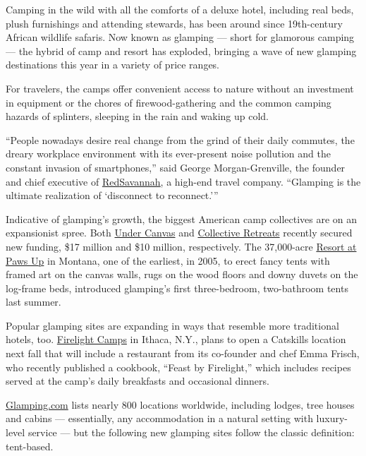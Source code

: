 Camping in the wild with all the comforts of a deluxe hotel, including
real beds, plush furnishings and attending stewards, has been around
since 19th-century African wildlife safaris. Now known as glamping ---
short for glamorous camping --- the hybrid of camp and resort has
exploded, bringing a wave of new glamping destinations this year in a
variety of price ranges.

For travelers, the camps offer convenient access to nature without an
investment in equipment or the chores of firewood-gathering and the
common camping hazards of splinters, sleeping in the rain and waking up
cold.

``People nowadays desire real change from the grind of their daily
commutes, the dreary workplace environment with its ever-present noise
pollution and the constant invasion of smartphones,'' said George
Morgan-Grenville, the founder and chief executive of
\href{https://www.redsavannah.com/}{Red}\href{https://www.redsavannah.com/}{Savannah}\href{https://www.redsavannah.com/}{,}
a high-end travel company. ``Glamping is the ultimate realization of
`disconnect to reconnect.'''

Indicative of glamping's growth, the biggest American camp collectives
are on an expansionist spree. Both
\href{https://www.undercanvas.com/}{Under Canvas} and
\href{http://www.travelweekly.com/Travel-News/Hotel-News/Glamping-expansion-Collective-Retreats-gets-10M-investment}{Collective
Retreats} recently secured new funding, \$17 million and \$10 million,
respectively. The 37,000-acre \href{http://pawsup.com/}{Resort at Paws
Up} in Montana, one of the earliest, in 2005, to erect fancy tents with
framed art on the canvas walls, rugs on the wood floors and downy duvets
on the log-frame beds, introduced glamping's first three-bedroom,
two-bathroom tents last summer.

Popular glamping sites are expanding in ways that resemble more
traditional hotels, too. \href{http://www.firelightcamps.com/}{Firelight
Camps} in Ithaca, N.Y., plans to open a Catskills location next fall
that will include a restaurant from its co-founder and chef Emma Frisch,
who recently published a cookbook, ``Feast by Firelight,'' which
includes recipes served at the camp's daily breakfasts and occasional
dinners.

\href{http://glamping.com/}{Glamping.com} lists nearly 800 locations
worldwide, including lodges, tree houses and cabins --- essentially, any
accommodation in a natural setting with luxury-level service --- but the
following new glamping sites follow the classic definition: tent-based.

